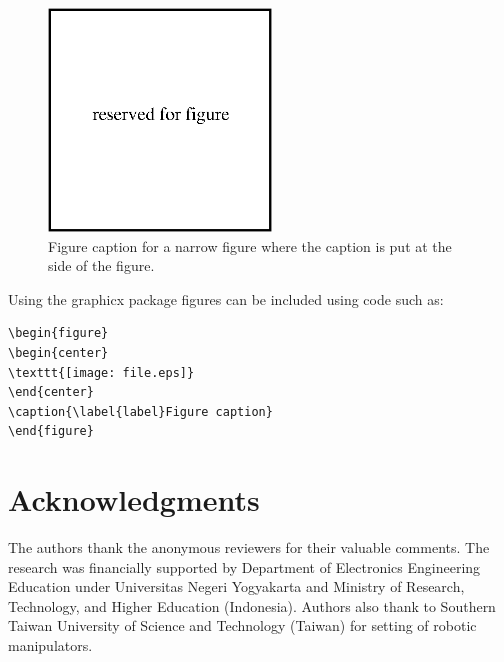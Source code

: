 \documentclass[a4paper]{jpconf}
\begin{document}
\begin{figure}[h]
    \includegraphics[width=14pc]{name.eps}\hspace{2pc}%
    \begin{minipage}[b]{14pc}\caption{\label{label}Figure caption for a narrow figure where the caption is put at the side of the figure.}
    \end{minipage}
\end{figure}

Using the graphicx package figures can be included using code such as:
\begin{verbatim}
\begin{figure}
\begin{center}
\texttt{[image: file.eps]}
\end{center}
\caption{\label{label}Figure caption}
\end{figure}
\end{verbatim}

\section*{Acknowledgments}
The authors thank the anonymous reviewers for their valuable comments. The research was financially
supported by Department of Electronics Engineering Education under Universitas Negeri Yogyakarta
and Ministry of Research, Technology, and Higher Education (Indonesia). Authors also thank to
Southern Taiwan University of Science and Technology (Taiwan) for setting of robotic manipulators.
\end{document}
